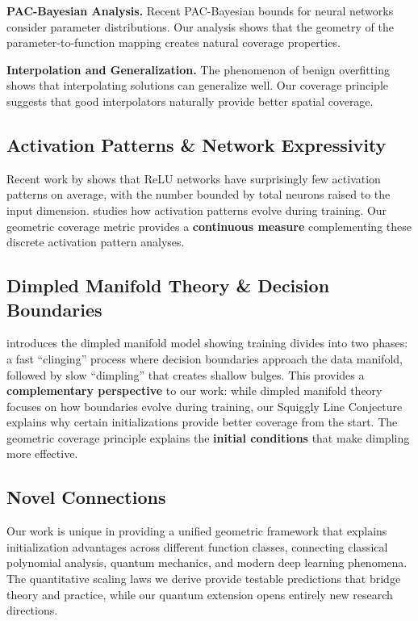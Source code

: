 \textbf{PAC-Bayesian Analysis.} Recent PAC-Bayesian bounds for neural networks \cite{Neyshabur2017ExploringGI} consider parameter distributions. Our analysis shows that the geometry of the parameter-to-function mapping creates natural coverage properties.

\textbf{Interpolation and Generalization.} The phenomenon of benign overfitting \cite{Bartlett2019BenignOI} shows that interpolating solutions can generalize well. Our coverage principle suggests that good interpolators naturally provide better spatial coverage.

\subsection{Activation Patterns \& Network Expressivity}

Recent work by \cite{Hanin2019DeepRN} shows that ReLU networks have surprisingly few activation patterns on average, with the number bounded by total neurons raised to the input dimension. \cite{Hartmann2021StudyingEvolution} studies how activation patterns evolve during training. Our geometric coverage metric provides a \textbf{continuous measure} complementing these discrete activation pattern analyses.

\subsection{Dimpled Manifold Theory \& Decision Boundaries}

\cite{Shamir2021TheDM} introduces the dimpled manifold model showing training divides into two phases: a fast ``clinging'' process where decision boundaries approach the data manifold, followed by slow ``dimpling'' that creates shallow bulges. This provides a \textbf{complementary perspective} to our work: while dimpled manifold theory focuses on how boundaries evolve during training, our Squiggly Line Conjecture explains why certain initializations provide better coverage from the start. The geometric coverage principle explains the \textbf{initial conditions} that make dimpling more effective.

\subsection{Novel Connections}

Our work is unique in providing a unified geometric framework that explains initialization advantages across different function classes, connecting classical polynomial analysis, quantum mechanics, and modern deep learning phenomena. The quantitative scaling laws we derive provide testable predictions that bridge theory and practice, while our quantum extension opens entirely new research directions.